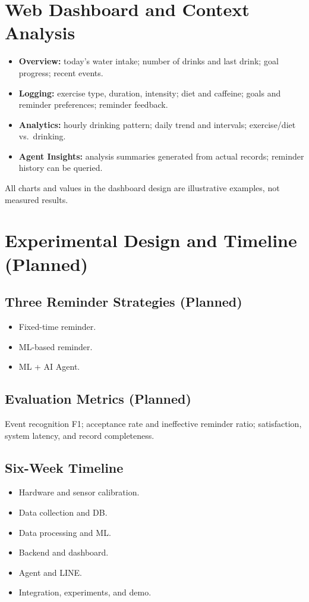 \documentclass[conference]{IEEEtran}
\begin{document}
\section{Web Dashboard and Context Analysis}\label{sec:dashboard}

\begin{itemize}
\item \textbf{Overview:} today's water intake; number of drinks and last drink; goal progress; recent events.
\item \textbf{Logging:} exercise type, duration, intensity; diet and caffeine; goals and reminder preferences; reminder feedback.
\item \textbf{Analytics:} hourly drinking pattern; daily trend and intervals; exercise/diet vs.\ drinking.
\item \textbf{Agent Insights:} analysis summaries generated from actual records; reminder history can be queried.
\end{itemize}
All charts and values in the dashboard design are illustrative examples, not measured results.

\section{Experimental Design and Timeline (Planned)}\label{sec:experiments}

\subsection{Three Reminder Strategies (Planned)}
\begin{itemize}
\item[A] Fixed-time reminder.
\item[B] ML-based reminder.
\item[C] ML + AI Agent.
\end{itemize}

\subsection{Evaluation Metrics (Planned)}
Event recognition F1; acceptance rate and ineffective reminder ratio; satisfaction, system latency, and record completeness.

\subsection{Six-Week Timeline}
\begin{itemize}
\item[W1] Hardware and sensor calibration.
\item[W2] Data collection and DB.
\item[W3] Data processing and ML.
\item[W4] Backend and dashboard.
\item[W5] Agent and LINE.
\item[W6] Integration, experiments, and demo.
\end{itemize}
\end{document}
